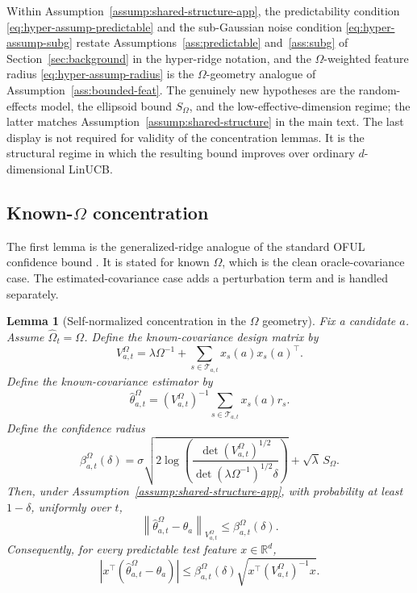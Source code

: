 \documentclass{article} %
\newtheorem{lemma}[theorem]{Lemma}
\begin{document}
Within Assumption~\ref{assump:shared-structure-app}, the predictability condition \eqref{eq:hyper-assump-predictable} and the sub-Gaussian noise condition \eqref{eq:hyper-assump-subg} restate Assumptions~\ref{ass:predictable} and~\ref{ass:subg} of Section~\ref{sec:background} in the hyper-ridge notation, and the $\Omega$-weighted feature radius \eqref{eq:hyper-assump-radius} is the $\Omega$-geometry analogue of Assumption~\ref{ass:bounded-feat}. The genuinely new hypotheses are the random-effects model, the ellipsoid bound $S_\Omega$, and the low-effective-dimension regime; the latter matches Assumption~\ref{assump:shared-structure} in the main text. The last display is not required for validity of the concentration lemmas.  It is the structural regime in which the resulting bound improves over ordinary \(d\)-dimensional LinUCB.

\subsection{Known-\(\Omega\) concentration}

The first lemma is the generalized-ridge analogue of the standard OFUL confidence bound \citep{abbasi2011oful,chu2011linucb}.  It is stated for known \(\Omega\), which is the clean oracle-covariance case.  The estimated-covariance case adds a perturbation term and is handled separately.

\begin{lemma}[Self-normalized concentration in the \(\Omega\) geometry]
\label{lem:hyper-sn}
Fix a candidate \(a\).  Assume \(\widehat{\Omega}_t=\Omega\).  Define the known-covariance design matrix by
\begin{equation}
\label{eq:hyper-known-V}
V_{a,t}^{\Omega}
=
\lambda\Omega^{-1}
+
\sum_{s\in\mathcal{T}_{a,t}}
x_s(a)x_s(a)^\top .
\end{equation}
Define the known-covariance estimator by
\begin{equation}
\label{eq:hyper-known-est}
\widehat{\theta}_{a,t}^{\Omega}
=
\left(V_{a,t}^{\Omega}\right)^{-1}
\sum_{s\in\mathcal{T}_{a,t}}
x_s(a)r_s .
\end{equation}
Define the confidence radius
\begin{equation}
\label{eq:hyper-beta}
\beta_{a,t}^{\Omega}(\delta)
=
\sigma
\sqrt{
2\log
\left(
\frac{
\det(V_{a,t}^{\Omega})^{1/2}
}{
\det(\lambda\Omega^{-1})^{1/2}\delta
}
\right)
}
+
\sqrt{\lambda}\,S_{\Omega}.
\end{equation}
Then, under Assumption~\ref{assump:shared-structure-app}, with probability at least \(1-\delta\), uniformly over \(t\),
\begin{equation}
\label{eq:hyper-sn-param}
\left\|
\widehat{\theta}_{a,t}^{\Omega}-\theta_a
\right\|_{V_{a,t}^{\Omega}}
\le
\beta_{a,t}^{\Omega}(\delta).
\end{equation}
Consequently, for every predictable test feature \(x\in\mathbb{R}^d\),
\begin{equation}
\label{eq:hyper-sn-prediction}
\left|
x^\top
\left(
\widehat{\theta}_{a,t}^{\Omega}-\theta_a
\right)
\right|
\le
\beta_{a,t}^{\Omega}(\delta)
\sqrt{x^\top\left(V_{a,t}^{\Omega}\right)^{-1}x}.
\end{equation}
\end{lemma}
\end{document}
